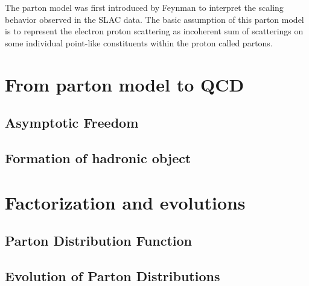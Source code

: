 The parton model was first introduced by Feynman to interpret the 
scaling behavior observed in the SLAC data. The basic assumption
of this parton model is to represent the electron proton scattering
as incoherent sum of scatterings on some individual point-like constituents 
within the proton called partons.




\section{From parton model to QCD}

\subsection{Asymptotic Freedom}

\subsection{Formation of hadronic object}

\section{Factorization and evolutions}\label{sec:DIS}

\subsection{Parton Distribution Function}

\subsection{Evolution of Parton Distributions}\label{sec:PDFevo}


